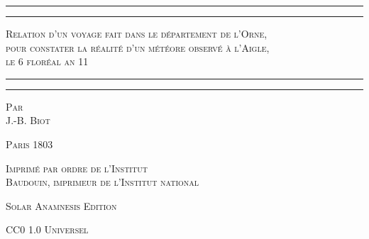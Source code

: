 \documentclass[a4paper, 11pt, oneside, polutonikogreek, french]{article}
\begin{document}
\begin{titlepage} %
	\centering %

	
	\rule{\textwidth}{1.6pt}\vspace*{-\baselineskip}\vspace*{2pt} %
	\rule{\textwidth}{0.4pt} %
	
	\vspace{1\baselineskip} %
	
	{\scshape\Huge Relation d'un voyage fait dans le département de l'Orne,\\ pour constater la réalité d'un météore observé à l'Aigle,\\ le 6 floréal an 11}
	
	\vspace{1\baselineskip} %

	\rule{\textwidth}{0.4pt}\vspace*{-\baselineskip}\vspace{3.2pt} %
	\rule{\textwidth}{1.6pt} %
	
	\vspace{1\baselineskip} %
	

	{\scshape Par \\\Large J.-B. Biot} %
	    
    \vspace*{\fill}

	{\small\scshape Paris 1803}

	\vspace{0.5\baselineskip}

	{\small\scshape Imprimé par ordre de l'Institut \\ Baudouin, imprimeur de l'Institut national}
	
	\vspace{0.5\baselineskip} %

    {\small\scshape Solar Anamnesis Edition} %
	
	{\scshape\small CC0 1.0 Universel} %
\end{titlepage}
\setlength{\parskip}{1mm plus1mm minus1mm}
\clearpage
\end{document}
